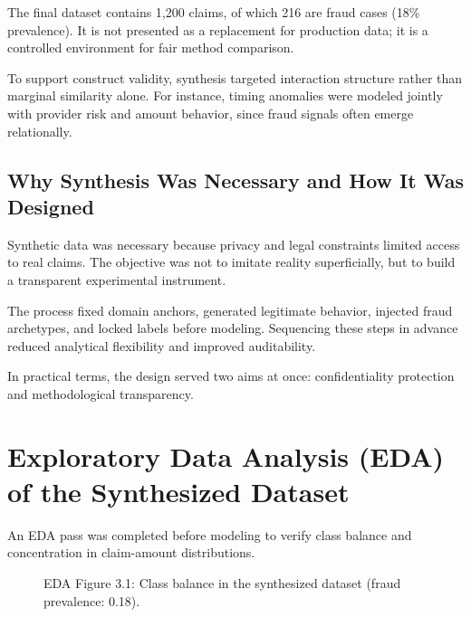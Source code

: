 \documentclass[12pt,a4paper]{report}
\begin{document}
The final dataset contains 1,200 claims, of which 216 are fraud cases (18\% prevalence). It is not presented as a replacement for production data; it is a controlled environment for fair method comparison.

To support construct validity, synthesis targeted interaction structure rather than marginal similarity alone. For instance, timing anomalies were modeled jointly with provider risk and amount behavior, since fraud signals often emerge relationally.

\subsection{Why Synthesis Was Necessary and How It Was Designed}
Synthetic data was necessary because privacy and legal constraints limited access to real claims. The objective was not to imitate reality superficially, but to build a transparent experimental instrument.

The process fixed domain anchors, generated legitimate behavior, injected fraud archetypes, and locked labels before modeling. Sequencing these steps in advance reduced analytical flexibility and improved auditability.

In practical terms, the design served two aims at once: confidentiality protection and methodological transparency.

\section{Exploratory Data Analysis (EDA) of the Synthesized Dataset}
An EDA pass was completed before modeling to verify class balance and concentration in claim-amount distributions.

\begin{figure}[H]
\centering
{}
\caption{EDA Figure 3.1: Class balance in the synthesized dataset (fraud prevalence: 0.18).}
\label{fig:eda_class_balance}
\end{figure}
\end{document}
